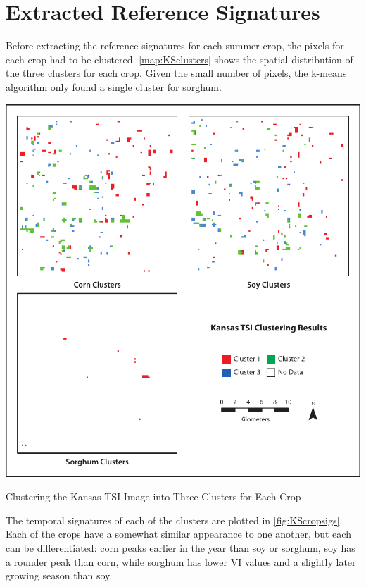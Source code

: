 \section{Extracted Reference Signatures}

Before extracting the reference signatures for each summer crop, the pixels for each crop had to be clustered. \autoref{map:KSclusters} shows the spatial distribution of the three clusters for each crop. Given the small number of pixels, the k-means algorithm only found a single cluster for sorghum.

\begin{ssfigure}
  \centering
  \includegraphics[width=\textwidth]{Graphics/KSclustered.pdf}
  \caption{Clustering the Kansas TSI Image into Three Clusters for Each Crop}
  \label{map:KSclusters}
\end{ssfigure}

The temporal signatures of each of the clusters are plotted in \autoref{fig:KScropsigs}. Each of the crops have a somewhat similar appearance to one another, but each can be differentiated: corn peaks earlier in the year than soy or sorghum, soy has a rounder peak than corn, while sorghum has lower VI values and a slightly later growing season than soy.

